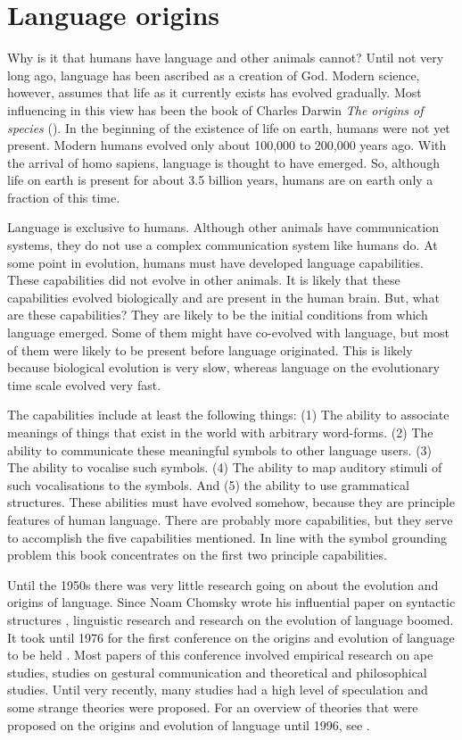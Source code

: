 \section{Language origins}\label{s:intro:origins}

Why is it that humans have language and other animals cannot? Until not very long ago, language has been ascribed as a creation of God. Modern science, however, assumes that life as it currently exists has evolved gradually. Most influencing in this view has been the book of Charles Darwin {\em The origins of species} (\citeyear{darwin:1968}). In the beginning of the existence of life on earth, humans were not yet present. Modern humans evolved only about 100,000 to 200,000 years ago. With the arrival of homo sapiens, language is thought to have emerged. So, although life on earth is present for about 3.5 billion years, humans are on earth only a fraction of this time.


Language is exclusive to humans. Although other animals have communication systems, they do not use a complex communication system like humans do. At some point in evolution, humans must have developed language capabilities. These capabilities did not evolve in other animals. It is likely that these capabilities evolved biologically and are present in the human brain. But, what are these capabilities? They are likely to be the initial conditions from which language emerged. Some of them might have co-evolved with language, but most of them were likely to be present before language originated. This is likely because biological evolution is very slow, whereas language on the evolutionary time scale evolved very fast.

The capabilities include at least the following things: (1) The ability to associate meanings of things that exist in the world with arbitrary word-forms. (2) The ability to communicate these meaningful symbols to other language users. (3) The ability to vocalise such symbols. (4) The ability to map auditory stimuli of such vocalisations to the symbols. And (5) the ability to use grammatical structures. These abilities must have evolved somehow, because they are principle features of human language. There are probably more capabilities, but they serve to accomplish the five capabilities mentioned. In line with the symbol grounding problem this book concentrates on the first two principle capabilities.

Until the 1950s there was very little research going on about the evolution and origins of language. Since Noam Chomsky wrote his influential paper on syntactic structures \citep{chomsky:1956}, linguistic research and research on the evolution of language boomed. It took until 1976 for the first conference on the origins and evolution of language to be held \citep{harnad:1976}. Most papers of this conference involved empirical research on ape studies, studies on gestural communication and theoretical and philosophical studies. Until very recently, many studies had a high level of speculation and some strange theories were proposed. For an overview of theories that were proposed on the origins and evolution of language until 1996, see \citealt{aitchison:1996}.

